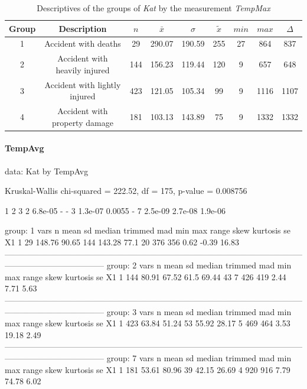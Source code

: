 \documentclass[a4paper,headsepline,footsepline,fontsize=11pt,BCOR=12mm,DIV=12]{report}
\begin{document}
\begin{table}[h]
	\centering
	\begin{tabular}{c|c|c|c|c|c|c|c|c}
		\toprule  
		Group & Description & $n$ & $\bar{x}$ & $\sigma$ & $\tilde{x}$ & $min$ & $max$ & $\Delta$ \\
		\midrule
		1 & Accident with deaths & 29 & 290.07 & 190.59 & 255 & 27 & 864 & 837 \\ 
 		2 & Accident with heavily injured & 144 & 156.23 & 119.44 & 120 & 9 & 657 & 648 \\
 		3 & Accident with lightly injured & 423 & 121.05 & 105.34 & 99 & 9 & 1116 & 1107 \\
 		4 & Accident with property damage & 181 & 103.13 & 143.89 & 75 & 9 & 1332 & 1332 \\ 
 		\bottomrule
	\end{tabular}
	\caption{Descriptives of the groups of \textit{Kat} by the measurement \textit{TempMax}}
\end{table}

\paragraph{TempAvg}
data:  Kat by TempAvg

Kruskal-Wallis chi-squared = 222.52, df = 175, p-value = 0.008756

  1       2       3      
2 6.8e-05 -       -      
3 1.3e-07 0.0055  -      
7 2.5e-09 2.7e-08 1.9e-06

group: 1
   vars  n   mean    sd median trimmed  mad min max range skew kurtosis    se
X1    1 29 148.76 90.65    144  143.28 77.1  20 376   356 0.62    -0.39 16.83
------------------------------------------------------------------------------------------------------------------------------------------------ 
group: 2
   vars   n  mean    sd median trimmed mad min max range skew kurtosis   se
X1    1 144 80.91 67.52   61.5   69.44  43   7 426   419 2.44     7.71 5.63
------------------------------------------------------------------------------------------------------------------------------------------------ 
group: 3
   vars   n  mean    sd median trimmed   mad min max range skew kurtosis   se
X1    1 423 63.84 51.24     53   55.92 28.17   5 469   464 3.53    19.18 2.49
------------------------------------------------------------------------------------------------------------------------------------------------ 
group: 7
   vars   n  mean    sd median trimmed   mad min max range skew kurtosis   se
X1    1 181 53.61 80.96     39   42.15 26.69   4 920   916 7.79    74.78 6.02
\end{document}
